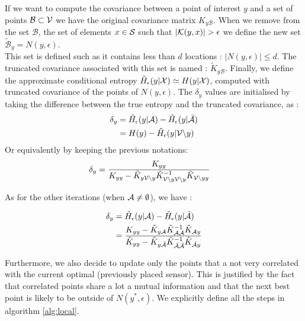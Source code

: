 If we want to compute the covariance between a point of interest $y$ and a set of points $\mathcal{B} \subset \V $ we have the original covariance matrix $K_{y\mathcal{B}}$. When we remove from the set $\mathcal{B}$, the set of elements  $x \in \S$ such that $|\K(y,x)| > \epsilon $ we define the new set  $\tilde{\mathcal{B}}_y = N(y,\epsilon)$. \\

This set is defined such as it contains less than $d$ locations : $|N(y,\epsilon)| \leq d $. The truncated covariance associated with this set is named : $\tilde{K}_{y\mathcal{B}}$. Finally, we define the approximate conditional entropy $\tilde{H}_\epsilon(y | \X) \simeq H(y | \X)$, computed with truncated covariance of the points of $N(y,\epsilon)$. The $\delta_y$ values are initialised by taking the difference between the true entropy and the truncated covariance, as :
\begin{align}
    \delta_y &= \tilde{H}_\epsilon(y | \A) - \tilde{H}_\epsilon(y | \bar{\A}) \\
            &= H(y) - \tilde{H}_\epsilon(y | \V \backslash y )
\end{align}
Or equivalently by keeping the previous notations: 
\begin{align}
    \delta_y &= \frac{K_{yy} }{K_{yy} - \tilde{K}_{y\V \backslash y} \tilde{K}_{\V \backslash y \V \backslash y}^{-1} \tilde{K}_{\V \backslash y y} } \label{equ:initLocal}
\end{align}


As for the other iterations (when $\A \neq \emptyset$), we have : 

\begin{align}
    \delta_y &= \tilde{H}_\epsilon(y | \A) - \tilde{H}_\epsilon(y | \bar{\A}) \\
    &= \frac{K_{yy} - \tilde{K}_{y\A} \tilde{K}_{\A\A}^{-1} \tilde{K}_{\A y} }{\tilde{K}_{yy} - \tilde{K}_{y\bar{\A}} \tilde{K}_{\bar{\A}\bar{\A}}^{-1} \tilde{K}_{\bar{\A} y} } \label{equ:updateLocal}
\end{align}


Furthermore, we also decide to update only the points that a not very correlated with the current optimal (previously placed sensor). This is justified by the fact that correlated points share a lot a mutual information and that the next best point is likely to be outside of $N(y^*,\epsilon)$. We explicitly define all the steps in algorithm \ref{alg:local}. \\

